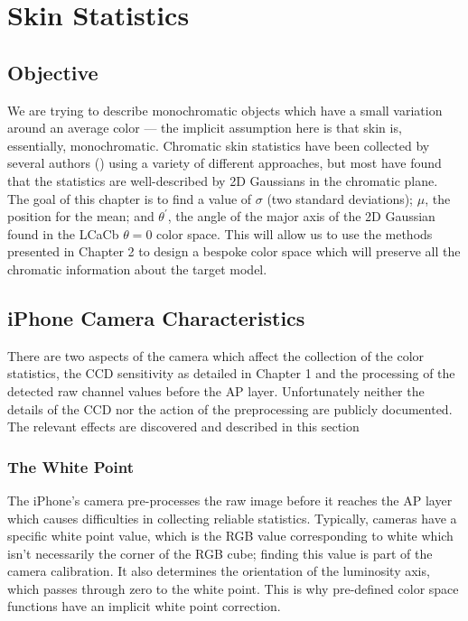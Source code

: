 
\chapter{Skin Statistics}\label{sec:ChapSkin}
\ifpdf
    \graphicspath{{Chapter3/Figs/Raster/}{Chapter3/Figs/PDF/}{Chapter3/Figs/}}
\else
    \graphicspath{{Chapter3/Figs/Vector/}{Chapter3/Figs/}}
\fi

\section{Objective}\label{sec:Objective}
We are trying to describe monochromatic objects which have a small variation around an average color --- the implicit assumption here is that skin is, essentially, monochromatic. Chromatic skin statistics have been collected by several authors (\cite{yang1998a,kollias1995,jedynak2003a,gomez2002a,Lee2002,Sigal2000a,Terrillon1999a}) using a variety of different approaches, but most have found that the statistics are well-described by 2D Gaussians in the chromatic plane. The goal of this chapter is to find a value of $\sigma$ (two standard deviations); $\mu$, the position for the mean; and $\theta^\prime$, the angle of the major axis of the 2D Gaussian found in the LCaCb $\theta = 0$ color space. This will allow us to use the methods presented in Chapter 2 to design a bespoke color space which will preserve all the chromatic information about the target model.

\section{iPhone Camera Characteristics} \label{sec:iPhoneCameraCharacteristics}
There are two aspects of the camera which affect the collection of the color statistics, the CCD sensitivity as detailed in Chapter 1 and the processing of the detected raw channel values before the AP layer. Unfortunately neither the details of the CCD nor the action of the preprocessing are publicly documented. The relevant effects are discovered and described in this section 

\subsection{The White Point}\label{sec:WhitePoint}
The iPhone's camera pre-processes the raw image before it reaches the AP layer which causes difficulties in collecting reliable statistics. Typically, cameras have a specific white point value, which is the RGB value corresponding to white which isn't necessarily the corner of the RGB cube; finding this value is part of the camera calibration. It also determines the orientation of the luminosity axis, which passes through zero to the white point. This is why pre-defined color space functions have an implicit white point correction. 

